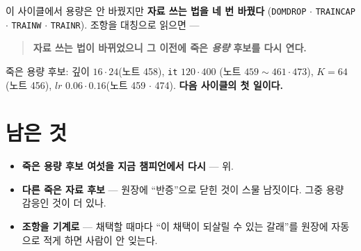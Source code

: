 \documentclass[11pt]{article}
\begin{document}
이 사이클에서 용량은 안 바꿨지만 \textbf{자료 쓰는 법을 네 번 바꿨다}
(\texttt{DOMDROP} $\cdot$ \texttt{TRAINCAP} $\cdot$ \texttt{TRAINW}
$\cdot$ \texttt{TRAINR}). 조항을 대칭으로 읽으면 ---

\begin{quote}
\textbf{자료 쓰는 법이 바뀌었으니 그 이전에 죽은 \emph{용량} 후보를 다시
연다.}
\end{quote}

죽은 용량 후보: 깊이 $16 \cdot 24$(노트 458), \texttt{it} $120 \cdot 400$
(노트 $459 \sim 461 \cdot 473$), $K{=}64$(노트 456), $lr$ $0.06 \cdot
0.16$(노트 459 $\cdot$ 474). \textbf{다음 사이클의 첫 일이다.}

\section*{남은 것}

\begin{itemize}
\item \textbf{죽은 용량 후보 여섯을 지금 챔피언에서 다시} --- 위.
\item \textbf{다른 죽은 자료 후보} --- 원장에 ``반증''으로 닫힌 것이
스물 남짓이다. 그중 용량 감응인 것이 더 있나.
\item \textbf{조항을 기계로} --- 채택할 때마다 ``이 채택이 되살릴 수 있는
갈래''를 원장에 자동으로 적게 하면 사람이 안 잊는다.
\end{itemize}
\end{document}
